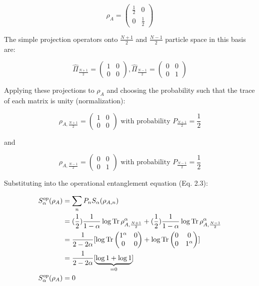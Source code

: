 \begin{samepage}
\begin{equation}
\rho_{A} = 
\begin{pmatrix}
\frac{1}{2} & 0 \\
0 & \frac{1}{2}
\end{pmatrix}
\end{equation}

The simple projection operators onto $\frac{N+1}{2}$ and $\frac{N-1}{2}$ particle space in this basis are:

\begin{equation}
\hat{\Pi}_{\frac{N+1}{2}} = \begin{pmatrix} 1 & 0 \\ 0 & 0 \end{pmatrix} , 
\hat{\Pi}_{\frac{N-1}{2}} = \begin{pmatrix} 0 & 0 \\ 0 & 1 \end{pmatrix} 
\end{equation}

Applying these projections to $\rho_{A}$ and choosing the probability such that the trace of each matrix is unity (normalization):

\begin{equation}
\rho_{A,{\frac{N+1}{2}}} = \begin{pmatrix} 1 & 0 \\ 0 & 0 \end{pmatrix}  \text{ with probability } P_{\frac{N+1}{2}} = \frac{1}{2}
\end{equation}

and 

\begin{equation}
\rho_{A,{\frac{N-1}{2}}} = \begin{pmatrix} 0 & 0 \\ 0 & 1 \end{pmatrix}  \text{ with probability } P_{\frac{N-1}{2}} = \frac{1}{2}
\end{equation}

Substituting into the operational entanglement equation (Eq. 2.3):

\begin {align} 
S_{\alpha}^{op}(\rho_A) &= \sum_{n} P_n S_{\alpha}(\rho_{A,n}) \\
&= (\frac{1}{2})\frac{1}{1-\alpha} \log{\operatorname{Tr}{\rho_{A,\frac{N+1}{2}}^{\alpha}}} + (\frac{1}{2})\frac{1}{1-\alpha} \log{\operatorname{Tr}{\rho_{A,\frac{N-1}{2}}^{\alpha}}} \\
&=\frac{1}{2-2\alpha}[ \log{\operatorname{Tr}{\begin{pmatrix}  1^{\alpha} & 0 \\ 0 & 0   \end{pmatrix}}} + \log{\operatorname{Tr}{\begin{pmatrix}  0 & 0 \\ 0 & 1^{\alpha}   \end{pmatrix}}}]\\
&=  \frac{1}{2-2\alpha}[ \underbrace{\log{1} + \log{1}}_{=0} ]\\
S_{\alpha}^{op}(\rho_A) &= 0
\end {align}


\end{samepage}
